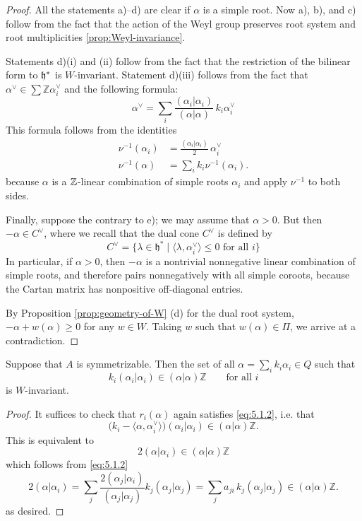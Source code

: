 \documentclass[12pt]{article}
\begin{document}
\begin{proof}
    All the statements a)--d) are clear if $\alpha$ is a simple root. Now a), b), and c) follow from the fact that the action of the Weyl group preserves root system and root multiplicities \ref{prop:Weyl-invariance}.

    Statements d)(i) and (ii) follow from the fact that the restriction of the bilinear form to $\mathfrak{h}^*$ is $W$-invariant. Statement d)(iii) follows from the fact that $\alpha^\vee \in \sum \mathbb{Z}\alpha_i^\vee$ and the following formula:
    \[
        \alpha^\vee = \sum_i \frac{(\alpha_i|\alpha_i)}{(\alpha|\alpha)}\, k_i \alpha_i^\vee
    \] This formula follows from the identities \begin{align*}
        \nu^{-1}(\alpha_i) & = \frac{(\alpha_i|\alpha_i)}{2} \, \alpha_i^\vee \\
        \nu^{-1}(\alpha)   & = \sum_i k_i \nu^{-1}(\alpha_i).
    \end{align*} because $\alpha$ is a $\mathbb{Z}$-linear combination of simple roots $\alpha_i$ and apply $\nu^{-1}$ to both sides.

    Finally, suppose the contrary to e); we may assume that $\alpha > 0$. But then $-\alpha \in C^\vee$, where we recall that the dual cone $C^\vee$ is defined by
    \[
        C^\vee = \{ \lambda \in \mathfrak{h}^* \mid \langle \lambda, \alpha_i^\vee \rangle \leq 0 \text{ for all } i \}
    \] In particular, if $\alpha > 0$, then $-\alpha$ is a nontrivial nonnegative linear combination of simple roots, and therefore pairs nonnegatively with all simple coroots, because the Cartan matrix has nonpositive off-diagonal entries.

    By Proposition \ref{prop:geometry-of-W} (d) for the dual root system, $-\alpha + w(\alpha) \geq 0$ for any $w \in W$. Taking $w$ such that $w(\alpha) \in \Pi$, we arrive at a contradiction.
\end{proof}

\begin{lemma}\label{lem:5.1.1}
    Suppose that $A$ is symmetrizable. Then the set of all
    $\alpha = \sum_i k_i \alpha_i \in Q$ such that
    \begin{equation}\label{eq:5.1.2}
        k_i (\alpha_i|\alpha_i) \in (\alpha|\alpha)\mathbb{Z}
        \qquad \text{for all $i$}
    \end{equation}
    is $W$-invariant.
\end{lemma}

\begin{proof}
    It suffices to check that $r_i(\alpha)$ again satisfies \ref{eq:5.1.2}, i.e. that
    \[
        \big(k_i - \langle \alpha,\alpha_i^\vee\rangle\big)(\alpha_i|\alpha_i)
        \in (\alpha|\alpha)\mathbb{Z}.
    \]
    This is equivalent to
    \begin{equation}\label{eq:5.1.3}
        2(\alpha|\alpha_i) \in (\alpha|\alpha)\mathbb{Z}
    \end{equation}
    which follows from \ref{eq:5.1.2}
    \[
        2(\alpha|\alpha_i)
        = \sum_j \frac{2(\alpha_j|\alpha_i)}{(\alpha_j|\alpha_j)}
        k_j(\alpha_j|\alpha_j)
        = \sum_j a_{ji}\,k_j(\alpha_j|\alpha_j)
        \in (\alpha|\alpha)\mathbb{Z}.
    \]
    as desired.
\end{proof}
\end{document}
